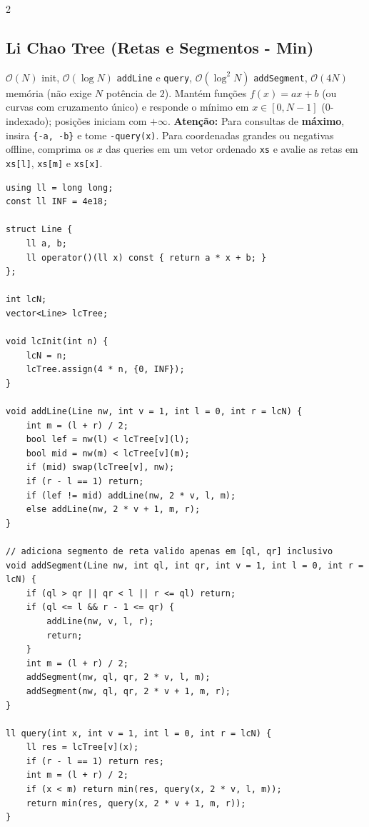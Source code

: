 \documentclass[11pt]{article}
\begin{document}
\begin{multicols}{2}
\subsection{Li Chao Tree (Retas e Segmentos - Min)}
$\mathcal{O}(N)$ init, $\mathcal{O}(\log N)$ \texttt{addLine} e \texttt{query}, $\mathcal{O}(\log^2 N)$ \texttt{addSegment}, $\mathcal{O}(4N)$ memória (não exige $N$ potência de $2$). Mantém funções $f(x) = ax + b$ (ou curvas com cruzamento único) e responde o mínimo em $x \in [0, N-1]$ (0-indexado); posições iniciam com $+\infty$. \textbf{Atenção:} Para consultas de \textbf{máximo}, insira \texttt{\{-a, -b\}} e tome \texttt{-query(x)}. Para coordenadas grandes ou negativas offline, comprima os $x$ das queries em um vetor ordenado \texttt{xs} e avalie as retas em \texttt{xs[l]}, \texttt{xs[m]} e \texttt{xs[x]}.
\begin{lstlisting}
using ll = long long;
const ll INF = 4e18;

struct Line {
    ll a, b;
    ll operator()(ll x) const { return a * x + b; }
};

int lcN;
vector<Line> lcTree;

void lcInit(int n) {
    lcN = n;
    lcTree.assign(4 * n, {0, INF});
}

void addLine(Line nw, int v = 1, int l = 0, int r = lcN) {
    int m = (l + r) / 2;
    bool lef = nw(l) < lcTree[v](l);
    bool mid = nw(m) < lcTree[v](m);
    if (mid) swap(lcTree[v], nw);
    if (r - l == 1) return;
    if (lef != mid) addLine(nw, 2 * v, l, m);
    else addLine(nw, 2 * v + 1, m, r);
}

// adiciona segmento de reta valido apenas em [ql, qr] inclusivo
void addSegment(Line nw, int ql, int qr, int v = 1, int l = 0, int r = lcN) {
    if (ql > qr || qr < l || r <= ql) return;
    if (ql <= l && r - 1 <= qr) {
        addLine(nw, v, l, r);
        return;
    }
    int m = (l + r) / 2;
    addSegment(nw, ql, qr, 2 * v, l, m);
    addSegment(nw, ql, qr, 2 * v + 1, m, r);
}

ll query(int x, int v = 1, int l = 0, int r = lcN) {
    ll res = lcTree[v](x);
    if (r - l == 1) return res;
    int m = (l + r) / 2;
    if (x < m) return min(res, query(x, 2 * v, l, m));
    return min(res, query(x, 2 * v + 1, m, r));
}
\end{lstlisting}


\end{multicols}
\end{document}
